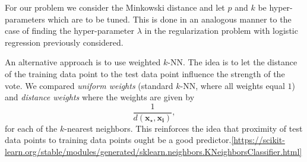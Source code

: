 \documentclass[../../project.tex]{subfiles}
\begin{document}
	For our problem we consider the Minkowski distance and let $p$ and $k$ be hyper-parameters which are to be tuned. This is done in an analogous manner to the case of finding the hyper-parameter $\lambda$ in the regularization problem with logistic regression previously considered.
	
	
	An alternative approach is to use weighted $k$-NN. The idea is to let the distance of the training data point to the test data point influence the strength of the vote. We compared \textit{uniform weights} (standard $k$-NN, where all weights equal $1$) and \textit{distance weights} where the weights are given by 
	\begin{equation}
	\dfrac{1}{d(\boldsymbol{x_{\star}, \boldsymbol{x_i}})}, 
	\end{equation}
	for each of the $k$-nearest neighbors. This reinforces the idea that proximity of test data points to training data points ought be a good predictor.\ref{https://scikit-learn.org/stable/modules/generated/sklearn.neighbors.KNeighborsClassifier.html}
\end{document}
